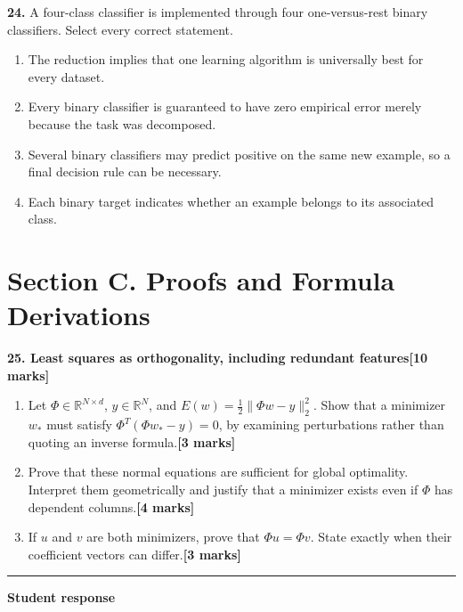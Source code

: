 \documentclass[11pt,a4paper]{article}
\begin{document}
\par\noindent\begin{minipage}{\linewidth}
\textbf{24.} A four-class classifier is implemented through four one-versus-rest binary classifiers. Select every correct statement.
\begin{enumerate}[label=(\Alph*),leftmargin=8mm,itemsep=2pt,topsep=2pt]
\item The reduction implies that one learning algorithm is universally best for every dataset.
\item Every binary classifier is guaranteed to have zero empirical error merely because the task was decomposed.
\item Several binary classifiers may predict positive on the same new example, so a final decision rule can be necessary.
\item Each binary target indicates whether an example belongs to its associated class.
\end{enumerate}

\end{minipage}\par\vspace{3mm}
\newpage\section*{Section C. Proofs and Formula Derivations}
\textbf{25. Least squares as orthogonality, including redundant features}\hfill\textbf{[10 marks]}\par\medskip
\begin{enumerate}[label=(\alph*),leftmargin=8mm,itemsep=3pt]
\item Let \(\Phi\in\mathbb R^{N\times d}\), \(y\in\mathbb R^N\), and \(E(w)=\tfrac12\|\Phi w-y\|_2^2\). Show that a minimizer \(w_*\) must satisfy \(\Phi^T(\Phi w_*-y)=0\), by examining perturbations rather than quoting an inverse formula.\hfill\textbf{[3 marks]}
\item Prove that these normal equations are sufficient for global optimality. Interpret them geometrically and justify that a minimizer exists even if \(\Phi\) has dependent columns.\hfill\textbf{[4 marks]}
\item If \(u\) and \(v\) are both minimizers, prove that \(\Phi u=\Phi v\). State exactly when their coefficient vectors can differ.\hfill\textbf{[3 marks]}
\end{enumerate}\par\medskip\hrule\medskip\textbf{Student response}\par
\end{document}
